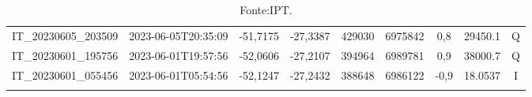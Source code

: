 \begin{table}[htb!]
\begin{tabular}{ccccS[table-format=6.0]S[table-format=7.0]ccc}
            IT\_20230605\_203509 & 2023-06-05T20:35:09 & -51,7175 & -27,3387 & 429030 & 6975842 & 0,8 & \num[round-precision=3,round-mode=figures,scientific-notation=true]{29450.1} & Q \\
            IT\_20230601\_195756 & 2023-06-01T19:57:56 & -52,0606 & -27,2107 & 394964 & 6989781 & 0,9 & \num[round-precision=3,round-mode=figures,scientific-notation=true]{38000.7} & Q \\
            IT\_20230601\_055456 & 2023-06-01T05:54:56 & -52,1247 & -27,2432 & 388648 & 6986122 & -0,9 & \num[round-precision=3,round-mode=figures,scientific-notation=true]{18.0537} & I \\
             \\
          \bottomrule
      \end{tabular}
  \label{tab:dados_terremoto}
  \caption*{Fonte:IPT.}
\end{table}

